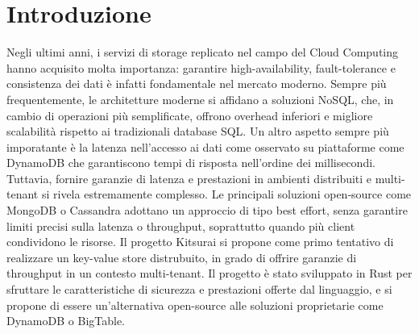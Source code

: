 \section{Introduzione}
\label{sec:introduzione}

%

Negli ultimi anni, i servizi di storage replicato nel campo del Cloud Computing hanno acquisito molta importanza: garantire high-availability, fault-tolerance e consistenza dei dati è infatti fondamentale nel mercato moderno.
Sempre più frequentemente, le architetture moderne si affidano a soluzioni NoSQL, che, in cambio di operazioni più semplificate, offrono overhead inferiori e migliore scalabilità rispetto ai tradizionali database SQL.
Un altro aspetto sempre più imporatante è la latenza nell'accesso ai dati come osservato su piattaforme come DynamoDB che garantiscono tempi di risposta nell'ordine dei millisecondi.
Tuttavia, fornire garanzie di latenza e prestazioni in ambienti distribuiti e multi-tenant si rivela estremamente complesso. Le principali soluzioni open‑source come MongoDB o Cassandra adottano un approccio di tipo best effort, senza garantire limiti precisi sulla latenza o throughput, soprattutto quando più client condividono le risorse.
Il progetto Kitsurai si propone come primo tentativo di realizzare un key-value store distrubuito, in grado di offrire garanzie di throughput in un contesto multi-tenant. 
Il progetto è stato sviluppato in Rust per sfruttare le caratteristiche di sicurezza e prestazioni offerte dal linguaggio, e si propone di essere un'alternativa open-source alle soluzioni proprietarie come DynamoDB o BigTable.
